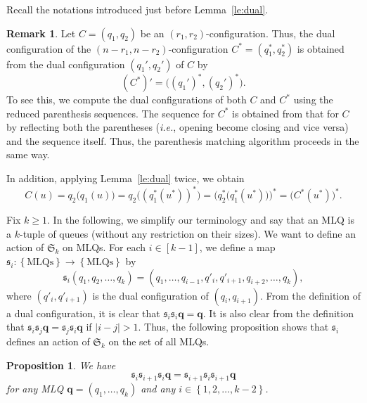 \documentclass[reqno]{amsart}
\newcommand{\0}{\phantom{c}}
\newcommand{\SymGp}[1]{\mathfrak{S}_{#1}} %
\newcommand{\qq}{\mathbf{q}}
\newcommand{\fraks}{\mathfrak{s}}
\newcommand{\set}[1]{\left\{ #1 \right\}}
\newcommand{\abs}[1]{\left| #1 \right|}
\newcommand{\tup}[1]{\left( #1 \right)}
\newcommand{\ive}[1]{\left[ #1 \right]}
\theoremstyle{plain}
\newtheorem{prop}[thm]{Proposition}
\theoremstyle{definition}
\newtheorem{remark}[thm]{Remark}
\numberwithin{equation}{section}
\begin{document}
Recall the notations introduced just before Lemma~\ref{le:dual}.

\begin{remark}
\label{rmk:balanced-dual-let}
Let $C = (q_1, q_2)$ be an $(r_1, r_2)$-configuration.
Thus, the dual configuration of the $(n-r_1, n-r_2)$-configuration $C^* = \tup{q_1^*, q_2^*}$ is obtained from the dual configuration $\tup{q_1', q_2'}$ of $C$ by
\begin{equation}
 (C^*)' = \bigl( (q_1')^*, (q_2')^* \bigr) .
 \label{eq.rmk:balanced-dual-let.dual}
\end{equation}
To see this, we compute the dual configurations of both $C$ and $C^*$ using the reduced parenthesis sequences. The sequence for $C^*$ is obtained from that for $C$ by reflecting both the parentheses (\textit{i.e.}, opening become closing and vice versa) and the sequence itself. Thus, the parenthesis matching algorithm proceeds in the same way.

In addition, applying Lemma~\ref{le:dual} twice, we obtain
\[
C(u) = q_2\bigl( q_1(u) \bigr) = q_2\bigl( (q^*_1(u^*))^* \bigr) = \bigl( q_2^*\bigl( q_1^*(u^*) \bigr) \bigr)^* = \bigl( C^*(u^*) \bigr)^* .
\]
\end{remark}

Fix $k \geq 1$.
In the following, we simplify our terminology and say that an MLQ
is a $k$-tuple of queues (without any restriction on their sizes).
We want to define an action of $\SymGp{k}$ on MLQs.
For each $i \in \ive{k-1}$, we define a map $\fraks_i \colon \set{\text{MLQs}} \to \set{\text{MLQs}}$ by
\[
\fraks_i(q_1, q_2, \dotsc, q_k) = (q_1, \dotsc, q_{i-1}, q'_i, q'_{i+1}, q_{i+2}, \dotsc, q_k),
\]
where $\tup{q'_i, q'_{i+1}}$ is the dual configuration of $\tup{q_i, q_{i+1}}$.
From the definition of a dual configuration, it is clear that $\fraks_i \fraks_i \qq = \qq$.
It is also clear from the definition that $\fraks_i \fraks_j \qq = \fraks_j \fraks_i \qq$ if $\abs{i - j} > 1$.
Thus, the following proposition shows that $\fraks_i$ defines an action of $\SymGp{k}$ on the set of all MLQs.

\begin{prop} \label{prop:braid}
We have
\[
\fraks_i \fraks_{i+1} \fraks_i \qq
	   = \fraks_{i+1} \fraks_i \fraks_{i+1} \qq
\]
for any MLQ $\qq = \tup{q_1, \dotsc, q_k}$ and any $i \in \set{1, 2, \ldots, k-2}$.
\end{prop}
\end{document}

